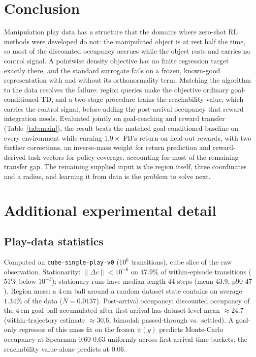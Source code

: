 \documentclass{article}
\newcommand{\cube}{c}
\begin{document}
\section{Conclusion}
\label{sec:conclusion}

Manipulation play data has a structure that the domains where zero-shot RL methods were developed do not: the manipulated object is at rest half the time, so most of the discounted occupancy accrues while the object rests and carries no control signal.
A pointwise density objective has no finite regression target exactly there, and the standard surrogate fails on a frozen, known-good representation with and without its orthonormality term.
Matching the algorithm to the data resolves the failure: region queries make the objective ordinary goal-conditioned TD, and a two-stage procedure trains the reachability value, which carries the control signal, before adding the post-arrival occupancy that reward integration needs.
Evaluated jointly on goal-reaching and reward transfer (Table~\ref{tab:main}), the result beats the matched goal-conditioned baseline on every environment while earning $1.9\times$ FB's return on held-out rewards, with two further corrections, an inverse-mass weight for return prediction and reward-derived task vectors for policy coverage, accounting for most of the remaining transfer gap.
The remaining supplied input is the region itself, three coordinates and a radius, and learning it from data is the problem to solve next.




\appendix
\section{Additional experimental detail}
\label{app:detail}

\subsection{Play-data statistics}
\label{app:playstats}

Computed on \texttt{cube-single-play-v0} ($10^6$ transitions), cube slice of the raw observation.
Stationarity: $\|\Delta\cube\|<10^{-6}$ on $47.9\%$ of within-episode transitions ($51\%$ below $10^{-3}$); stationary runs have median length $44$ steps (mean $43.9$, p90 $47$).
Region mass: a $4$\,cm ball around a random dataset state contains on average $1.34\%$ of the data ($\bar N=0.0137$).
Post-arrival occupancy: discounted occupancy of the $4$\,cm goal ball accumulated after first arrival has dataset-level mean $\approx24.7$ (within-trajectory estimate $\approx30.6$, bimodal: passed-through vs.\ settled).
A goal-only regressor of this mass fit on the frozen $\psi(g)$ predicts Monte-Carlo occupancy at Spearman $0.60$-$0.63$ uniformly across first-arrival-time buckets; the reachability value alone predicts at $0.06$.
\end{document}
